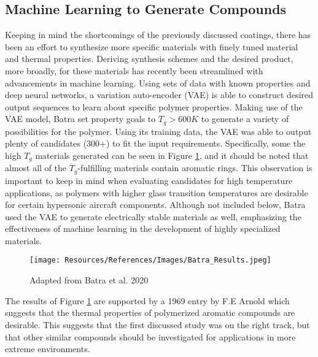 \documentclass[12pt]{article}
\begin{document}
\begin{multicols}{2}
\subsection{Machine Learning to Generate Compounds}

\indent Keeping in mind the shortcomings of the previously discussed coatings, there has been an effort to synthesize more specific materials with finely tuned material and thermal properties. Deriving synthesis schemes and the desired product, more broadly, for these materials has recently been streamlined with advancements in machine learning. Using sets of data with known properties and deep neural networks, a variation auto-encoder (VAE) is able to construct desired output sequences to learn about specific polymer properties. \citep{Batra2020} Making use of the VAE model, Batra set property goals to $T_g>600K$ to generate a variety of possibilities for the polymer. Using its training data, the VAE was able to output plenty of candidates (300+) to fit the input requirements. Specifically, some the high $T_g$ materials generated can be seen in Figure \ref{fig:Batra_Results}, and it should be noted that almost all of the $T_g$-fulfilling materials contain aromatic rings. This observation is important to keep in mind when evaluating candidates for high temperature applications, as polymers with higher glass transition temperatures are desirable for certain hypersonic aircraft components. Although not included below, Batra used the VAE to generate electrically stable materials as well, emphasizing the effectiveness of machine learning in the development of highly specialized materials.

\begin{figure}[H]
    \centering
    \texttt{[image: Resources/References/Images/Batra\_Results.jpeg]}
    \caption{\scriptsize{Adapted from Batra et al. 2020 \citep{Batra2020}}}
    \label{fig:Batra_Results}
\end{figure}

\indent The results of Figure \ref{fig:Batra_Results} are supported by a 1969 entry by F.E Arnold which suggests that the thermal properties of polymerized aromatic compounds are desirable. \citep{Arnold1969} This suggests that the first discussed study was on the right track, but that other similar compounds should be investigated for applications in more extreme environments.


\end{multicols}
\end{document}
